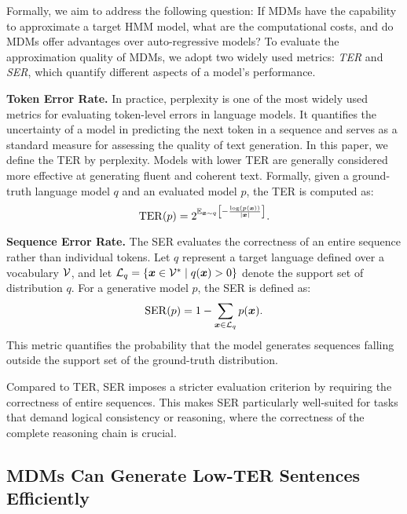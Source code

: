 Formally, we aim to address the following question: If MDMs have the capability to approximate a target HMM model, what are the computational costs, and do MDMs offer advantages over auto-regressive models? To evaluate the approximation quality of MDMs, we adopt two widely used metrics: \textit{TER} and \textit{SER}, which quantify different aspects of a model's performance.

\textbf{Token Error Rate.} In practice, perplexity is one of the most widely used metrics for evaluating token-level errors in language models. It quantifies the uncertainty of a model in predicting the next token in a sequence and serves as a standard measure for assessing the quality of text generation. In this paper, we define the TER by perplexity. Models with lower TER are generally considered more effective at generating fluent and coherent text. Formally, given a ground-truth language model $q$ and an evaluated model $p$, the TER is computed as:
\begin{equation}
    \operatorname{TER}(p) = 2^{\mathbb{E}_{{\bm{x}} \sim q} \left[ -\frac{\log (p({\bm{x}}))}{|{\bm{x}}|} \right]}.
\end{equation}

\textbf{Sequence Error Rate.} The SER evaluates the correctness of an entire sequence rather than individual tokens. Let $q$ represent a target language defined over a vocabulary ${\mathcal{V}}$, and let ${\mathcal{L}}_q = \{{\bm{x}} \in {\mathcal{V}}^* \mid q({\bm{x}}) > 0\}$ denote the support set of distribution $q$. For a generative model $p$, the SER is defined as:
\begin{equation}
\label{eq:SER_def}
    \operatorname{SER}(p) = 1 - \sum_{{\bm{x}} \in {\mathcal{L}}_q} p({\bm{x}}).
\end{equation}
This metric quantifies the probability that the model generates sequences falling outside the support set of the ground-truth distribution.

Compared to TER, SER imposes a stricter evaluation criterion by requiring the correctness of entire sequences. This makes SER particularly well-suited for tasks that demand logical consistency or reasoning, where the correctness of the complete reasoning chain is crucial. 
\subsection{MDMs Can Generate Low-TER Sentences Efficiently}
\label{sec:positive}


